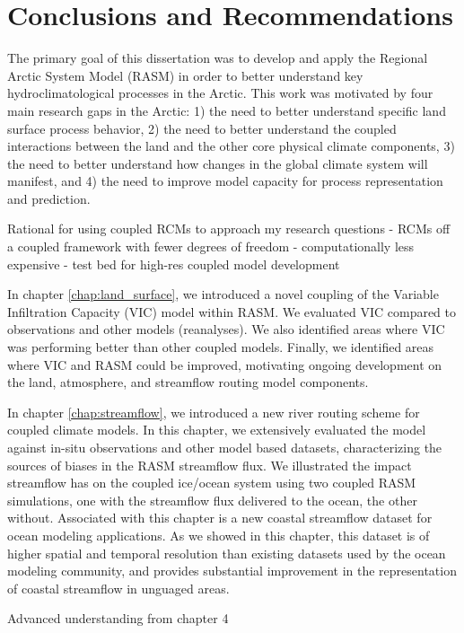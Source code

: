 \chapter{Conclusions and Recommendations}
\label{chap:conclusions}

The primary goal of this dissertation was to develop and apply the Regional Arctic System Model (RASM) in order to better understand key hydroclimatological processes in the Arctic.
This work was motivated by four main research gaps in the Arctic: 1) the need to better understand specific land surface process behavior, 2) the need to better understand the coupled interactions between the land and the other core physical climate components, 3) the need to better understand how changes in the global climate system will manifest, and 4) the need to improve model capacity for process representation and prediction.

Rational for using coupled RCMs to approach my research questions
  - RCMs off a coupled framework with fewer degrees of freedom
  - computationally less expensive
  - test bed for high-res coupled model development

In chapter \ref{chap:land_surface}, we introduced a novel coupling of the Variable Infiltration Capacity (VIC) model within RASM.
We evaluated VIC compared to observations and other models (reanalyses).
We also identified areas where VIC was performing better than other coupled models.
Finally, we identified areas where VIC and RASM could be improved, motivating ongoing development on the land, atmosphere, and streamflow routing model components.

In chapter \ref{chap:streamflow}, we introduced a new river routing scheme for coupled climate models.
In this chapter, we extensively evaluated the model against in-situ observations and other model based datasets, characterizing the sources of biases in the RASM streamflow flux.
We illustrated the impact streamflow has on the coupled ice/ocean system using two coupled RASM simulations, one with the streamflow flux delivered to the ocean, the other without.
Associated with this chapter is a new coastal streamflow dataset for ocean modeling applications.
As we showed in this chapter, this dataset is of higher spatial and temporal resolution than existing datasets used by the ocean modeling community, and provides substantial improvement in the representation of coastal streamflow in unguaged areas.

Advanced understanding from chapter 4

